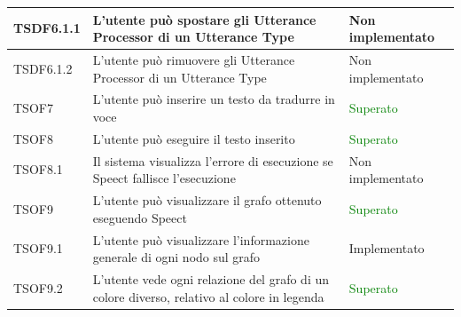 \documentclass[openany,12pt,a4paper]{report}
\begin{document}
\begin{longtable}{| p{2cm} |p{8cm} | p{2.5cm} |}
	\newline TSDF6.1.1&
	\newline L'utente può spostare gli Utterance Processor di un Utterance Type&
	\newline Non implementato
	\\[1em]
	\hline	
	
	\newline TSDF6.1.2&
	\newline L'utente può rimuovere gli Utterance Processor di un Utterance Type&
	\newline Non implementato
	\\[1em]
	\hline	
	
	\newline TSOF7&
	\newline L'utente può inserire un testo da tradurre in voce&
	\newline \textcolor{green}{Superato}
	\\[1em]
	
	\hline
	\newline TSOF8&
	\newline L'utente può eseguire il testo inserito&
	\newline \textcolor{green}{Superato}
	\\[1em]
	\hline
	\newline TSOF8.1&
	\newline Il sistema visualizza l'errore di esecuzione se Speect fallisce l'esecuzione&
	\newline Non implementato
	\\[1em]
	\hline
	
	\newline TSOF9&
	\newline L'utente può visualizzare il grafo ottenuto eseguendo Speect&
	\newline \textcolor{green}{Superato}
	\\[1em]
	\hline
	
	
	\newline TSOF9.1&
	\newline L'utente può visualizzare l'informazione generale di ogni nodo sul grafo&
	\newline Implementato
	\\[1em]
	\hline
	
	\newline TSOF9.2&
	\newline L'utente vede ogni relazione del grafo di un colore diverso, relativo al colore in legenda&
	\newline  \textcolor{green}{Superato}
	\\[1em]
	\hline
	

\end{longtable}
\end{document}
